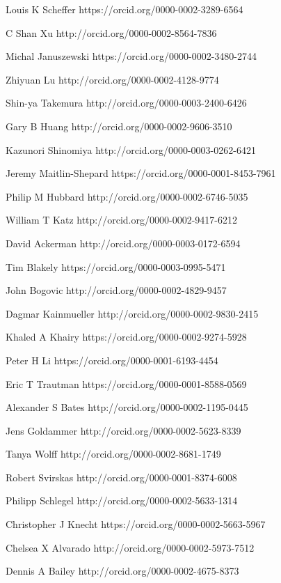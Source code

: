 \documentclass{article}
\begin{document}
\noindent Louis K Scheffer https://orcid.org/0000-0002-3289-6564\par
\noindent C Shan Xu http://orcid.org/0000-0002-8564-7836\par
\noindent Michal Januszewski https://orcid.org/0000-0002-3480-2744\par
\noindent Zhiyuan Lu http://orcid.org/0000-0002-4128-9774\par
\noindent Shin-ya Takemura http://orcid.org/0000-0003-2400-6426\par
\noindent Gary B Huang http://orcid.org/0000-0002-9606-3510\par
\noindent Kazunori Shinomiya http://orcid.org/0000-0003-0262-6421\par
\noindent Jeremy Maitlin-Shepard https://orcid.org/0000-0001-8453-7961\par
\noindent Philip M Hubbard http://orcid.org/0000-0002-6746-5035\par
\noindent William T Katz http://orcid.org/0000-0002-9417-6212\par
\noindent David Ackerman http://orcid.org/0000-0003-0172-6594\par
\noindent Tim Blakely https://orcid.org/0000-0003-0995-5471\par
\noindent John Bogovic http://orcid.org/0000-0002-4829-9457\par
\noindent Dagmar Kainmueller http://orcid.org/0000-0002-9830-2415\par
\noindent Khaled A Khairy https://orcid.org/0000-0002-9274-5928\par
\noindent Peter H Li https://orcid.org/0000-0001-6193-4454\par
\noindent Eric T Trautman https://orcid.org/0000-0001-8588-0569\par
\noindent Alexander S Bates http://orcid.org/0000-0002-1195-0445\par
\noindent Jens Goldammer http://orcid.org/0000-0002-5623-8339\par
\noindent Tanya Wolff http://orcid.org/0000-0002-8681-1749\par
\noindent Robert Svirskas http://orcid.org/0000-0001-8374-6008\par
\noindent Philipp Schlegel http://orcid.org/0000-0002-5633-1314\par
\noindent Christopher J Knecht https://orcid.org/0000-0002-5663-5967\par
\noindent Chelsea X Alvarado http://orcid.org/0000-0002-5973-7512\par
\noindent Dennis A Bailey http://orcid.org/0000-0002-4675-8373\par
\end{document}
